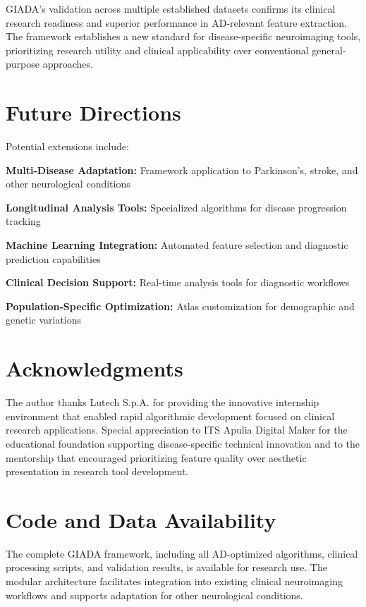 \documentclass[a4paper,11pt]{article}
\begin{document}
GIADA's validation across multiple established datasets confirms its clinical research readiness and superior performance in AD-relevant feature extraction. The framework establishes a new standard for disease-specific neuroimaging tools, prioritizing research utility and clinical applicability over conventional general-purpose approaches.

\section*{Future Directions}

Potential extensions include:

\textbf{Multi-Disease Adaptation:} Framework application to Parkinson's, stroke, and other neurological conditions

\textbf{Longitudinal Analysis Tools:} Specialized algorithms for disease progression tracking

\textbf{Machine Learning Integration:} Automated feature selection and diagnostic prediction capabilities

\textbf{Clinical Decision Support:} Real-time analysis tools for diagnostic workflows

\textbf{Population-Specific Optimization:} Atlas customization for demographic and genetic variations

\section*{Acknowledgments}

The author thanks Lutech S.p.A. for providing the innovative internship environment that enabled rapid algorithmic development focused on clinical research applications. Special appreciation to ITS Apulia Digital Maker for the educational foundation supporting disease-specific technical innovation and to the mentorship that encouraged prioritizing feature quality over aesthetic presentation in research tool development.

\section*{Code and Data Availability}

The complete GIADA framework, including all AD-optimized algorithms, clinical processing scripts, and validation results, is available for research use. The modular architecture facilitates integration into existing clinical neuroimaging workflows and supports adaptation for other neurological conditions.
\end{document}
